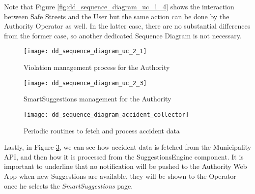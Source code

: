 Note that Figure \ref{fig:dd_sequence_diagram_uc_1_4} shows the interaction
between Safe Streets and the User but the same action can be done by the
Authority Operator as well. In the latter case, there are no substantial
differences from the former case, so another dedicated Sequence Diagram is not
necessary.

\begin{figure}[ht]
    \centering
    \texttt{[image: dd\_sequence\_diagram\_uc\_2\_1]}
    \caption{Violation management process for the Authority}
    \label{fig:dd_sequence_diagram_uc_2_1}
\end{figure}

\begin{figure}[ht]
    \centering
    \texttt{[image: dd\_sequence\_diagram\_uc\_2\_3]}
    \caption{SmartSuggestions management for the Authority}
    \label{fig:dd_sequence_diagram_uc_2_3}
\end{figure}

\clearpage

\begin{figure}[ht]
    \centering
    \texttt{[image: dd\_sequence\_diagram\_accident\_collector]}
    \caption{Periodic routines to fetch and process accident data}
    \label{fig:dd_sequence_diagram_accident_collector}
\end{figure}

Lastly, in Figure \ref{fig:dd_sequence_diagram_accident_collector}, we can see
how accident data is fetched from the Municipality API, and then how it is
processed from the SuggestionsEngine component. It is important to underline
that no notification will be pushed to the Authority Web App when new
Suggestions are available, they will be shown to the Operator once he selects
the \emph{SmartSuggestions} page.

